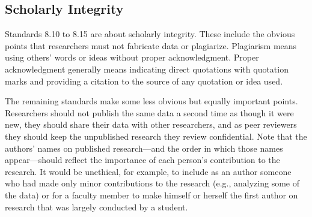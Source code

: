 \subsection{Scholarly Integrity}


Standards 8.10 to 8.15 are about scholarly integrity. These include the obvious points that researchers must not fabricate data or plagiarize. Plagiarism means using others' words or ideas without proper acknowledgment. Proper acknowledgment generally means indicating direct quotations with quotation marks and providing a citation to the source of any quotation or idea used.


The remaining standards make some less obvious but equally important points. Researchers should not publish the same data a second time as though it were new, they should share their data with other researchers, and as peer reviewers they should keep the unpublished research they review confidential. Note that the authors' names on published research---and the order in which those names appear---should reflect the importance of each person's contribution to the research. It would be unethical, for example, to include as an author someone who had made only minor contributions to the research (e.g., analyzing some of the data) or for a faculty member to make himself or herself the first author on research that was largely conducted by a student.


\subsection{}

